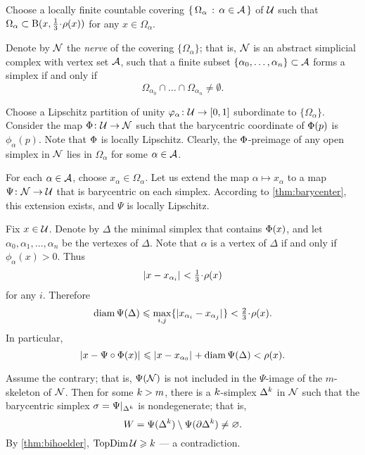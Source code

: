 Choose a locally finite countable covering $\left\{\,{\Omega_\alpha}\,:\,{\alpha\in\mathcal{A}}\,\right\}$ of $\mathcal{U}$ such that $\Omega_\alpha\subset \oBall(x,\tfrac{1}{3}\cdot\rho(x))$ for any $x\in \Omega_\alpha$. 

Denote by $\mathcal{N}$ the \emph{nerve} of the covering $\{\Omega_\alpha\}$;
that is, $\mathcal{N}$ is an abstract simplicial complex with 
vertex set $\mathcal{A}$,
such that a finite subset 
$\{\alpha_0,\z\dots,\alpha_n\}\subset\IndexSet$ 
forms a simplex if and only if
\[\Omega_{\alpha_0}
\cap
\dots\cap
\Omega_{\alpha_n}\ne\emptyset.\]

Choose a Lipschitz partition of unity 
$\varphi_\alpha\colon\mathcal{U}\to [0,1]$ subordinate to $\{\Omega_\alpha\}$.
Consider the map $\Phi\colon\mathcal{U}\to \mathcal{N}$ such that the barycentric coordinate of $\Phi(p)$ is $\phi_\alpha(p)$.
Note that $\Phi$ is locally Lipschitz. 
Clearly, the $\Phi$-preimage of any open simplex in $\mathcal{N}$ lies in $\Omega_\alpha$ for some $\alpha\in\mathcal{A}$.

For each $\alpha\in\mathcal{A}$, 
choose $x_\alpha\in\Omega_\alpha$.
Let us extend the map $\alpha\mapsto x_\alpha$
to a map $\Psi\colon\mathcal{N}\to\mathcal{U}$ that is barycentric on each simplex.
According to \ref{thm:barycenter}, this extension exists, 
and $\Psi$ is locally Lipschitz.

Fix $x\in\mathcal{U}$. Denote by $\Delta$ the minimal simplex that contains $\Phi(x)$, 
and let $\alpha_0,\alpha_1,\dots,\alpha_n$ be the vertexes of $\Delta$.
Note that $\alpha$ is a vertex of $\Delta$ if and only if $\phi_{\alpha}(x)>0$.
Thus
\[\dist{x}{x_{\alpha_i}}{}<\tfrac{1}{3}\cdot\rho(x)\] 
for any $i$.
Therefore 
\[\diam\Psi(\Delta)
\le
\max_{i,j}\{\dist{x_{\alpha_i}}{x_{\alpha_j}}{}\}
<
\tfrac{2}{3}\cdot\rho(x).\]
In particular, 
\[\dist{x}{\Psi\circ\map(x)}{}\le\dist{x}{x_{\alpha_0}}{}+\diam \Psi(\Delta) <\rho(x).\]

Assume the contrary;
that is, $\Psi(\mathcal{N})$ is not included in the $\Psi$-image of the $m$-skeleton of $\mathcal{N}$.
Then for some $k>m$,
there is a $k$-simplex $\Delta^k$ in $\mathcal{N}$
such that the barycentric simplex $\sigma=\Psi|_{\Delta^k}$ is nondegenerate; 
that is, 
$$W=\Psi(\Delta^k)\setminus\Psi(\partial\Delta^k)\ne \varnothing.
$$
By \ref{thm:bihoelder}, $\mathop{\rm TopDim}\nolimits\mathcal{U}\geqslant k$ --- a contradiction.
\qeds

